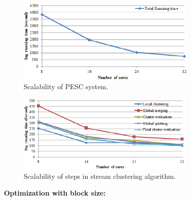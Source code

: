 \documentclass[conference]{IEEEtran}
\begin{document}
\begin{figure}[!t]
\centering
\includegraphics[height=1.6in]{./Figure/runningTime_cores.eps}
\caption{Scalability of PESC system.}
\label{fig_scalability_total_cores}
\end{figure}

\begin{figure}[!t]
\centering
\includegraphics[height=1.50in]{./Figure/phase_cores.eps}
\caption{Scalability of steps in stream clustering algorithm.}
\label{fig_scalability_phase_cores}
\end{figure}

\textbf{Optimization with block size: }
\end{document}
